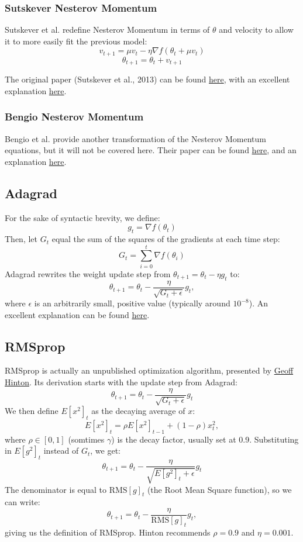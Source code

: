 \documentclass[fleqn]{article}
\begin{document}
\subsubsection{Sutskever Nesterov Momentum}
Sutskever et al. redefine Nesterov Momentum in terms of $\theta$ and
velocity to allow it to more easily fit the previous model:
\[ v_{t+1} = \mu v_t - \eta \nabla f(\theta_t + \mu v_t) \]
\[ \theta_{t+1} = \theta_t + v_{t+1} \]


The original paper (Sutskever et al., 2013) can be found
\href{http://www.cs.toronto.edu/~fritz/absps/momentum.pdf}{here},
with an excellent explanation
\href{https://jlmelville.github.io/mize/nesterov.html#sutskever_nesterov_momentum}
{here}.

\subsubsection{Bengio Nesterov Momentum}
Bengio et al. provide another transformation of the Nesterov Momentum
equations, but it will not be covered here. Their paper can be found
\href{https://arxiv.org/pdf/1212.0901.pdf}{here}, and an explanation
\href{https://jlmelville.github.io/mize/nesterov.html#bengio_nesterov_momentum}
{here}.

\subsection{Adagrad}
For the sake of syntactic brevity, we define:
\[ g_t = \nabla f(\theta_t) \]
Then, let $G_t$ equal the sum of the squares of the gradients at each time
step:
\[ G_t = \sum_{i=0}^t \nabla f(\theta_i) \]
Adagrad rewrites the weight update step from
$\theta_{t+1} = \theta_t - \eta g_t$ to:
\[ \theta_{t+1} = \theta_t - \frac{\eta}{\sqrt{G_t + \epsilon}} g_t, \]
where $\epsilon$ is an arbitrarily small, positive value (typically around
$10^{-8}$). An excellent explanation can be found
\href{http://ruder.io/optimizing-gradient-descent/index.html#adagrad}
{here}.

\subsection{RMSprop}
RMSprop is actually an unpublished optimization algorithm, presented by
\href{http://www.cs.toronto.edu/~tijmen/csc321/slides/lecture_slides_lec6.pdf}
{Geoff Hinton}. Its derivation starts with the update step from Adagrad:
\[ \theta_{t+1} = \theta_t - \frac{\eta}{\sqrt{G_t + \epsilon}} g_t \]
We then define $E[x^2]_t$ as the decaying average of $x$:
\[ E[x^2]_t = \rho E[x^2]_{t-1} + (1 - \rho)x_t^2, \]
where $\rho \in [0, 1]$ (somtimes $\gamma$) is the decay factor, usually
set at 0.9. Substituting in $E[g^2]_t$ instead of $G_t$, we get:
\[ \theta_{t+1} = \theta_t - \frac{\eta}{\sqrt{E[g^2]_t + \epsilon}} g_t \]
The denominator is equal to $\text{RMS}[g]_t$ (the Root Mean Square
function), so we can write:
\[ \theta_{t+1} = \theta_t - \frac{\eta}{\text{RMS}[g]_t} g_t, \]
giving us the definition of RMSprop. Hinton recommends $\rho=0.9$ and
$\eta=0.001$.
\end{document}
